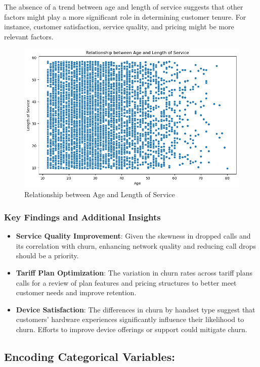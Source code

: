 \documentclass{article}
\begin{document}
The absence of a trend between age and length of service suggests that other factors might play a more significant role in determining customer tenure. For instance, customer satisfaction, service quality, and pricing might be more relevant factors.

\begin{figure}[h]
\centering
\includegraphics[width=0.4\linewidth]{Relationship between Age and Length of Service.png}
\caption{Relationship between Age and Length of Service}
\label{fig:distribution}
\end{figure}




\subsubsection{Key Findings and Additional Insights}

\begin{itemize}
\item \textbf{Service Quality Improvement}: Given the skewness in dropped calls and its correlation with churn, enhancing network quality and reducing call drops should be a priority.
\item \textbf{Tariff Plan Optimization}: The variation in churn rates across tariff plans calls for a review of plan features and pricing structures to better meet customer needs and improve retention.
\item \textbf{Device Satisfaction}: The differences in churn by handset type suggest that customers' hardware experiences significantly influence their likelihood to churn. Efforts to improve device offerings or support could mitigate churn.

\end{itemize}




\subsection{Encoding Categorical Variables:}
\end{document}
